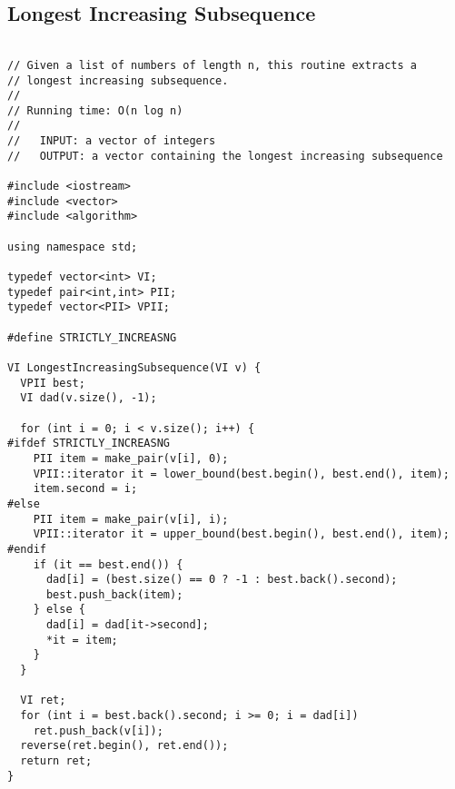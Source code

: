 \subsection{Longest Increasing Subsequence}
\begin{lstlisting}

// Given a list of numbers of length n, this routine extracts a 
// longest increasing subsequence.
//
// Running time: O(n log n)
//
//   INPUT: a vector of integers
//   OUTPUT: a vector containing the longest increasing subsequence

#include <iostream>
#include <vector>
#include <algorithm>

using namespace std;

typedef vector<int> VI;
typedef pair<int,int> PII;
typedef vector<PII> VPII;

#define STRICTLY_INCREASNG

VI LongestIncreasingSubsequence(VI v) {
  VPII best;
  VI dad(v.size(), -1);
  
  for (int i = 0; i < v.size(); i++) {
#ifdef STRICTLY_INCREASNG
    PII item = make_pair(v[i], 0);
    VPII::iterator it = lower_bound(best.begin(), best.end(), item);
    item.second = i;
#else
    PII item = make_pair(v[i], i);
    VPII::iterator it = upper_bound(best.begin(), best.end(), item);
#endif
    if (it == best.end()) {
      dad[i] = (best.size() == 0 ? -1 : best.back().second);
      best.push_back(item);
    } else {
      dad[i] = dad[it->second];
      *it = item;
    }
  }
  
  VI ret;
  for (int i = best.back().second; i >= 0; i = dad[i])
    ret.push_back(v[i]);
  reverse(ret.begin(), ret.end());
  return ret;
}
\end{lstlisting}